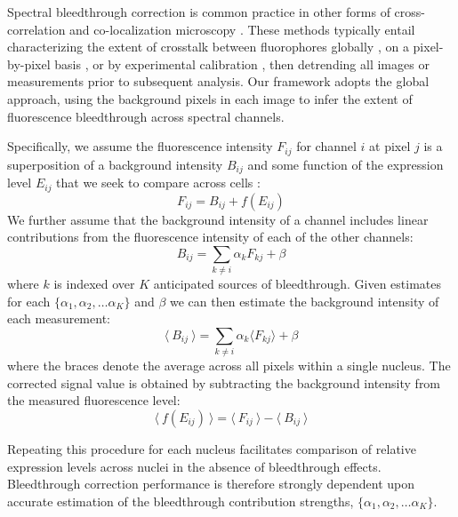 Spectral bleedthrough correction is common practice in other forms of cross-correlation and co-localization microscopy \cite{Bacia2012,Zinchuk2007}. These methods typically entail characterizing the extent of crosstalk between fluorophores globally \cite{Arsenovic2017,Kim2013}, on a pixel-by-pixel basis \cite{Elangovan2003}, or by experimental calibration \cite{Bacia2012}, then detrending all images or measurements prior to subsequent analysis. Our framework adopts the global approach, using the background pixels in each image to infer the extent of fluorescence bleedthrough across spectral channels.

Specifically, we assume the fluorescence intensity $F_{ij}$ for channel $i$ at pixel $j$ is a superposition of a background intensity $B_{ij}$ and some function of the expression level $E_{ij}$ that we seek to compare across cells \cite{McMullen2010}:
\begin{equation}
F_{ij} = B_{ij} + f(E_{ij})
\end{equation}
We further assume that the background intensity of a channel includes linear contributions from the fluorescence intensity of each of the other channels:
\begin{equation}
B_{ij} = \sum_{k \neq i}{\alpha_k F_{kj}} + \beta
\end{equation}
where $k$ is indexed over $K$ anticipated sources of bleedthrough. Given estimates for each $\{\alpha_1, \alpha_2, \ldots \alpha_K\}$ and $\beta$ we can then estimate the background intensity of each measurement:
\begin{equation} \label{eq:bg_model}
\langle\ B_{ij}\ \rangle = \sum_{k \neq i}{\alpha_k \langle F_{kj} \rangle} + \beta
\end{equation}
where the braces denote the average across all pixels within a single nucleus. The corrected signal value is obtained by subtracting the background intensity from the measured fluorescence level:
\begin{equation} \label{eq:correction}
\langle\ f(E_{ij}) \ \rangle = \langle\ F_{ij}\ \rangle - \langle\ B_{ij}\ \rangle
\end{equation}

Repeating this procedure for each nucleus facilitates comparison of relative expression levels across nuclei in the absence of bleedthrough effects. Bleedthrough correction performance is therefore strongly dependent upon accurate estimation of the bleedthrough contribution strengths, $\{\alpha_1, \alpha_2, \ldots \alpha_K\}$. 

